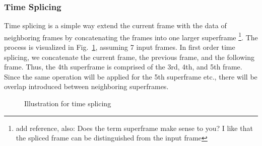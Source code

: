 \documentclass{article}
\begin{document}
\subsubsection{Time Splicing}
Time splicing is a simple way extend the current frame with the data of neighboring frames by concatenating the frames into one larger superframe \cite{}\footnote{add reference, also: Does the term superframe make sense to you? I like that the spliced frame can be distinguished from the input frame}. The process is visualized in Fig.~\ref{fig:splicing}, assuming 7 input frames. In first order time splicing, we concatenate the current frame, the previous frame, and the following frame. Thus, the 4th superframe is comprised of the 3rd, 4th, and 5th frame. Since the same operation will be applied for the 5th superframe etc., there will be overlap introduced between neighboring superframes. %
\begin{figure}
 \centerline{}
 \caption{Illustration for time splicing}
 \label{fig:splicing}
\end{figure}
\end{document}
